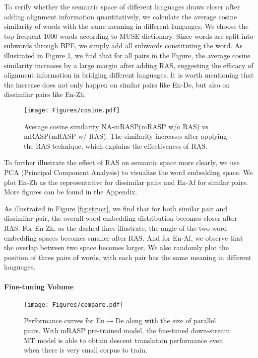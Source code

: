 \documentclass[11pt,a4paper]{article}
\newcommand{\method}{mRASP\xspace}
\begin{document}
To verify whether the semantic space of different languages draws closer after adding alignment information quantitatively, we calculate the average cosine similarity of words with the same meaning in different languages. We choose the top frequent 1000 words according to MUSE dictionary. Since words are split into subwords through BPE, we simply add all subwords constituting the word.   As illustrated in Figure \ref{fig:cos-sim}, we find that for all pairs in the Figure, the average cosine similarity increases by a large margin after adding RAS, suggesting the efficacy of alignment information in bridging different languages. It is worth mentioning that the increase does not only happen on similar pairs like En-De, but also on dissimilar pairs like En-Zh.


\begin{figure}[ht]
    \centering
    \texttt{[image: Figures/cosine.pdf]}
    \caption{Average cosine similarity NA-\method (\method w/o RAS) vs \method (\method w/ RAS). The similarity increases after applying the RAS technique, which explains the effectiveness of RAS. }
    \label{fig:cos-sim}
\end{figure}


To further illustrate the effect of RAS on semantic space more clearly, we use PCA (Principal Component Analysis)  to visualize the word embedding space. We plot En-Zh as the representative for dissimilar pairs and En-Af for similar pairs. More figures can be found in the Appendix.

As illustrated in Figure \ref{fig:struct}, we find that for both similar pair and dissimilar pair, the overall word embedding distribution becomes closer after RAS. For En-Zh, as the dashed lines illustrate, the angle of the two word embedding spaces becomes smaller after RAS. And for En-Af, we observe that the overlap between two space becomes larger. We also randomly plot the position of three pairs of words, with each pair has the same meaning in different languages. 






\paragraph{Fine-tuning Volume}
\begin{figure}[ht]
    \centering
    \texttt{[image: Figures/compare.pdf]}
    \caption{Performance curves for En$\rightarrow$De along with the size of parallel pairs. With \method pre-trained model, the fine-tuned down-stream MT model is able to obtain descent translation performance even when there is very small corpus to train. }
    \label{fig:compare}
\end{figure}
\end{document}
